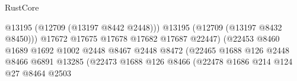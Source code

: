 \begin{lexlean}{RustCore}
\begin{coremodule}
                                                                  @13195
                                                                  (@12709 (@13197 @8442 @2448)))
                                                                @13195
                                                                (@12709 (@13197 @8432 @8450)))
                                                              @17672
                                                              @17675
                                                              @17678
                                                              @17682
                                                              @17687
                                                              @22447)
                                                            (@22453
                                                              @8460
                                                              @1689
                                                              @1692
                                                              @1002
                                                              @2448
                                                              @8467
                                                              @2448
                                                              @8472
                                                              (@22465
                                                                @1688
                                                                @126
                                                                @2448
                                                                @8466
                                                                @6891
                                                                @13285
                                                                (@22473
                                                                  @1688
                                                                  @126
                                                                  @8466
                                                                  (@22478
                                                                    @1686
                                                                    @214
                                                                    @124
                                                                    @27
                                                                    @8464
                                                                    @2503

\end{coremodule}
\end{lexlean}
